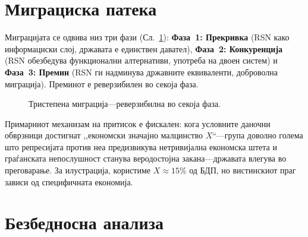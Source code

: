 \documentclass[11pt,a4paper,twocolumn]{article}
\begin{document}
\section{Миграциска патека}

Миграцијата се одвива низ три фази (Сл.~\ref{fig:migration}): \textbf{Фаза~1: Прекривка} (RSN како информациски слој, државата е единствен давател), \textbf{Фаза~2: Конкуренција} (RSN обезбедува функционални алтернативи, употреба на двоен систем) и \textbf{Фаза~3: Премин} (RSN ги надминува државните еквиваленти, доброволна миграција). Преминот е реверзибилен во секоја фаза.

\begin{figure}[ht]
\centering
{}
\caption{Тристепена миграција---реверзибилна во секоја фаза.}
\label{fig:migration}
\end{figure}

Примарниот механизам на притисок е фискален: кога условните даночни обврзници достигнат ,,економски значајно малцинство $X$``---група доволно голема што репресијата против неа предизвикува нетривијална економска штета и граѓанската непослушност станува веродостојна закана---државата влегува во преговарање. За илустрација, користиме $X \approx 15\%$ од БДП, но вистинскиот праг зависи од специфичната економија.

\section{Безбедносна анализа}
\end{document}
